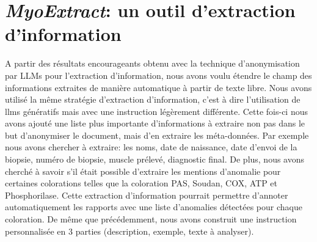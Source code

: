\section{\textit{MyoExtract}: un outil d'extraction d'information}
A partir des résultats encourageants obtenu avec la technique d'anonymisation par LLMs pour l'extraction d'information, nous avons voulu étendre le champ des informations extraites de manière automatique à partir de texte libre. Nous avons utilisé la même stratégie d'extraction d'information, c'est à dire l'utilisation de \gls{llms} génératifs mais avec une instruction légèrement différente. Cette fois-ci nous avons ajouté une liste plus importante d'informations à extraire non pas dans le but d'anonymiser le document, mais d'en extraire les méta-données. Par exemple nous avons chercher à extraire: les noms, date de naissance, date d'envoi de la biopsie, numéro de biopsie, muscle prélevé, diagnostic final. De plus, nous avons cherché à savoir s'il était possible d'extraire les mentions d'anomalie pour certaines colorations telles que la coloration PAS, Soudan, COX, ATP et Phosphorilase. Cette extraction d'information pourrait permettre d'annoter automatiquement les rapports avec une liste d'anomalies détectées pour chaque coloration. De même que précédemment, nous avons construit une instruction personnalisée en 3 parties (description, exemple, texte à analyser).

